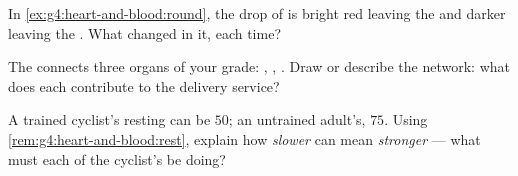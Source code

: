 \begin{exercise}[$\star\star$]\label{exo:g4:heart-and-blood:9}
In \cref{ex:g4:heart-and-blood:round}, the drop of  is
bright red leaving the  and darker leaving the 
. What changed in it, each time?
\end{exercise}

\begin{exercise}[$\star\star$]\label{exo:g4:heart-and-blood:10}
The  connects three organs of your grade: , , . Draw or describe the network: what
does each contribute to the delivery service?
\end{exercise}

\begin{exercise}[$\star\star\star$]\label{exo:g4:heart-and-blood:11}
A trained cyclist's resting  can be $50$; an untrained
adult's, $75$. Using \cref{rem:g4:heart-and-blood:rest},
explain how \emph{slower} can mean \emph{stronger} --- what
must each of the cyclist's  be doing?
\end{exercise}
